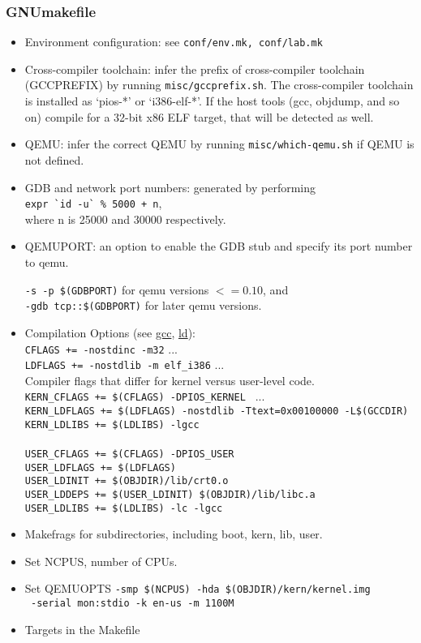 \subsubsection{GNUmakefile}
\begin{itemize}
\item Environment configuration: see \verb|conf/env.mk, conf/lab.mk|
\item Cross-compiler toolchain: infer the prefix of cross-compiler toolchain (GCCPREFIX) by running \verb|misc/gccprefix.sh|. The cross-compiler toolchain is installed as `pios-*' or `i386-elf-*'. If the host tools (gcc, objdump, and so on) compile for a 32-bit x86 ELF target, that will be detected as well.
\item QEMU: infer the correct QEMU by running \verb|misc/which-qemu.sh| if QEMU is not defined.
\item GDB and network port numbers: generated by performing\\ \verb|expr `id -u` % 5000 + n|,\\ where n is 25000 and 30000 respectively.
\item QEMUPORT: an option to enable the GDB stub and specify its port number to qemu.

\verb|-s -p $(GDBPORT)| for qemu versions $<=0.10$, and \\
\verb|-gdb tcp::$(GDBPORT)| for later qemu versions.
\item Compilation Options (see \href{http://linux.die.net/man/1/gcc}{gcc}, \href{http://linux.die.net/man/1/ld}{ld}): \\
\verb|CFLAGS += -nostdinc -m32| ...\\
\verb|LDFLAGS += -nostdlib -m elf_i386| ...\\
Compiler flags that differ for kernel versus user-level code.\\
\verb|KERN_CFLAGS += $(CFLAGS) -DPIOS_KERNEL | ...\\
\verb|KERN_LDFLAGS += $(LDFLAGS) -nostdlib -Ttext=0x00100000 -L$(GCCDIR)|\\
\verb|KERN_LDLIBS += $(LDLIBS) -lgcc|\\
~\\
\verb|USER_CFLAGS += $(CFLAGS) -DPIOS_USER|\\
\verb|USER_LDFLAGS += $(LDFLAGS)|\\
\verb|USER_LDINIT += $(OBJDIR)/lib/crt0.o|\\
\verb|USER_LDDEPS += $(USER_LDINIT) $(OBJDIR)/lib/libc.a|\\
\verb|USER_LDLIBS += $(LDLIBS) -lc -lgcc|\\
\item Makefrags for subdirectories, including boot, kern, lib, user.
\item Set NCPUS, number of CPUs.
\item Set QEMUOPTS \verb|-smp $(NCPUS) -hda $(OBJDIR)/kern/kernel.img|\\ \verb| -serial mon:stdio -k en-us -m 1100M|
\item Targets in the Makefile


\end{itemize}
